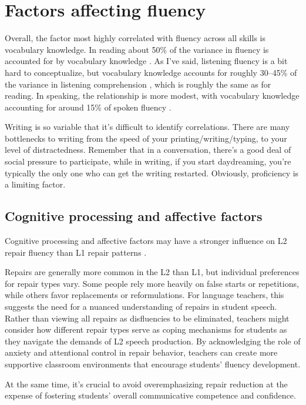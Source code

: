 \section{Factors affecting fluency}

Overall, the factor most highly correlated with fluency across all skills is vocabulary knowledge.  In reading about 50\% of the variance in fluency is accounted for by vocabulary knowledge \citep{Grabe2010}. As I've said, listening fluency is a bit hard to conceptualize, but vocabulary knowledge accounts for roughly 30--45\% of the variance in listening comprehension \citep{Zhang2022a}, which is roughly the same as for reading. In speaking, the relationship is more modest, with vocabulary knowledge accounting for around 15\% of spoken fluency \citep{Uchihara2019a,Liu2020}.

Writing is so variable that it's difficult to identify correlations. There are many bottlenecks to writing from the speed of your printing/writing/typing, to your level of distractedness. Remember that in a conversation, there's a good deal of social pressure to participate, while in writing, if you start daydreaming, you're typically the only one who can get the writing restarted. Obviously, proficiency is a limiting factor.

\subsection{Cognitive processing and affective factors}

Cognitive processing and affective factors may have a stronger influence on L2 repair fluency than L1 repair patterns \citep{Peltonen2024}.

Repairs are generally more common in the L2 than L1, but individual preferences for repair types vary. Some people rely more heavily on false starts or repetitions, while others favor replacements or reformulations. For language teachers, this suggests the need for a nuanced understanding of repairs in student speech. Rather than viewing all repairs as disfluencies to be eliminated, teachers might consider how different repair types serve as coping mechanisms for students as they navigate the demands of L2 speech production. By acknowledging the role of anxiety and attentional control in repair behavior, teachers can create more supportive classroom environments that encourage students' fluency development.

At the same time, it's crucial to avoid overemphasizing repair reduction at the expense of fostering students' overall communicative competence and confidence.

